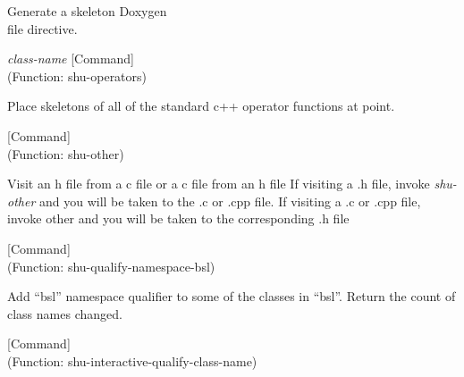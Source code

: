 \begin{doc-string}
Generate a skeleton Doxygen \\file directive.
\end{doc-string}

\vspace{1em}
\noindent
{}
\usebox{\funcname}\emph{class-name}
 \hfill [Command]\\%
 (Function: shu-operators)

\begin{doc-string}
Place skeletons of all of the standard c++ operator functions at point.
\end{doc-string}

\vspace{1em}
\noindent
{}
\usebox{\funcname}
 \hfill [Command]\\%
 (Function: shu-other)

\begin{doc-string}
Visit an h file from a c file or a c file from an h file
If visiting a .h file, invoke \emph{shu-other} and you will be taken to the
.c or .cpp file.  If visiting a .c or .cpp file, invoke other and you
will be taken to the corresponding .h file
\end{doc-string}

\vspace{1em}
\noindent
{}
\usebox{\funcname}
 \hfill [Command]\\%
 (Function: shu-qualify-namespace-bsl)

\begin{doc-string}
Add ``bsl'' namespace qualifier to some of the classes in ``bsl''.  Return the
count of class names changed.
\end{doc-string}

\vspace{1em}
\noindent
{}
\usebox{\funcname}
 \hfill [Command]\\%
 (Function: shu-interactive-qualify-class-name)

